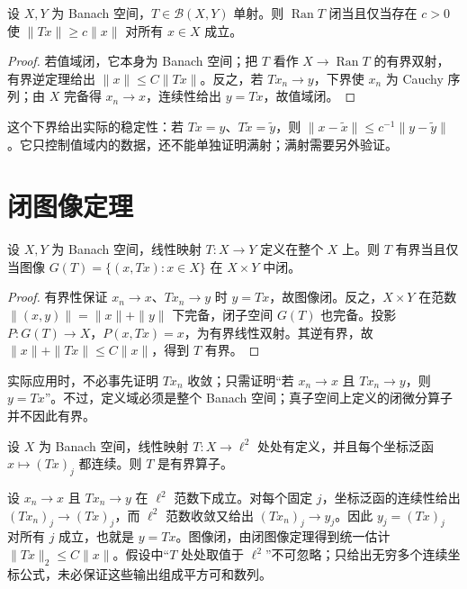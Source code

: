 \begin{proposition}[闭值域与稳定下界]\label{prop:fa-closed-range-bound}
设 $X,Y$ 为 Banach 空间，$T\in\mathcal B(X,Y)$ 单射。则 $\operatorname{Ran}T$ 闭当且仅当存在 $c>0$ 使 $\|Tx\|\geq c\|x\|$ 对所有 $x\in X$ 成立。
\end{proposition}
\begin{proof}
若值域闭，它本身为 Banach 空间；把 $T$ 看作 $X\to\operatorname{Ran}T$ 的有界双射，有界逆定理给出 $\|x\|\leq C\|Tx\|$。反之，若 $Tx_n\to y$，下界使 $x_n$ 为 Cauchy 序列；由 $X$ 完备得 $x_n\to x$，连续性给出 $y=Tx$，故值域闭。
\end{proof}
这个下界给出实际的稳定性：若 $Tx=y$、$T\widetilde x=\widetilde y$，则 $\|x-\widetilde x\|\leq c^{-1}\|y-\widetilde y\|$。它只控制值域内的数据，还不能单独证明满射；满射需要另外验证。

\section{闭图像定理}
\begin{theorem}\label{thm:fa-closed-graph}
设 $X,Y$ 为 Banach 空间，线性映射 $T:X\to Y$ 定义在整个 $X$ 上。则 $T$ 有界当且仅当图像 $G(T)=\{(x,Tx):x\in X\}$ 在 $X\times Y$ 中闭。
\end{theorem}
\begin{proof}
有界性保证 $x_n\to x$、$Tx_n\to y$ 时 $y=Tx$，故图像闭。反之，$X\times Y$ 在范数 $\|(x,y)\|=\|x\|+\|y\|$ 下完备，闭子空间 $G(T)$ 也完备。投影 $P:G(T)\to X$，$P(x,Tx)=x$，为有界线性双射。其逆有界，故 $\|x\|+\|Tx\|\leq C\|x\|$，得到 $T$ 有界。
\end{proof}
实际应用时，不必事先证明 $Tx_n$ 收敛；只需证明“若 $x_n\to x$ 且 $Tx_n\to y$，则 $y=Tx$”。不过，定义域必须是整个 Banach 空间；真子空间上定义的闭微分算子并不因此有界。

\begin{example}[利用闭图像验证连续性]
设 $X$ 为 Banach 空间，线性映射 $T:X\to\ell^2$ 处处有定义，并且每个坐标泛函 $x\mapsto(Tx)_j$ 都连续。则 $T$ 是有界算子。
\end{example}
\begin{solve}
设 $x_n\to x$ 且 $Tx_n\to y$ 在 $\ell^2$ 范数下成立。对每个固定 $j$，坐标泛函的连续性给出 $(Tx_n)_j\to(Tx)_j$，而 $\ell^2$ 范数收敛又给出 $(Tx_n)_j\to y_j$。因此 $y_j=(Tx)_j$ 对所有 $j$ 成立，也就是 $y=Tx$。图像闭，由闭图像定理得到统一估计 $\|Tx\|_2\leq C\|x\|$。假设中“$T$ 处处取值于 $\ell^2$”不可忽略；只给出无穷多个连续坐标公式，未必保证这些输出组成平方可和数列。
\end{solve}

